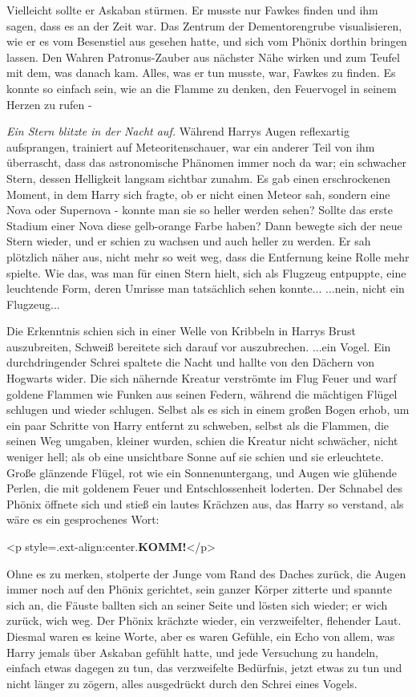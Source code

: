 Vielleicht sollte er Askaban stürmen. Er musste nur Fawkes finden und ihm sagen,
dass es an der Zeit war. Das Zentrum der Dementorengrube visualisieren, wie er
es vom Besenstiel aus gesehen hatte, und sich vom Phönix dorthin bringen lassen.
Den Wahren Patronus-Zauber aus nächster Nähe wirken und zum Teufel mit dem, was
danach kam. Alles, was er tun musste, war, Fawkes zu finden. Es konnte so
einfach sein, wie an die Flamme zu denken, den Feuervogel in seinem Herzen zu
rufen -

\emph{Ein Stern blitzte in der Nacht auf.}
Während Harrys Augen reflexartig aufsprangen, trainiert auf Meteoritenschauer,
war ein anderer Teil von ihm überrascht, dass das astronomische Phänomen immer
noch da war; ein schwacher Stern, dessen Helligkeit langsam sichtbar zunahm. Es
gab einen erschrockenen Moment, in dem Harry sich fragte, ob er nicht einen
Meteor sah, sondern eine Nova oder Supernova - konnte man sie so heller werden
sehen? Sollte das erste Stadium einer Nova diese gelb-orange Farbe haben? Dann
bewegte sich der neue Stern wieder, und er schien zu wachsen und auch heller zu
werden. Er sah plötzlich näher aus, nicht mehr so weit weg, dass die Entfernung
keine Rolle mehr spielte. Wie das, was man für einen Stern hielt, sich als
Flugzeug entpuppte, eine leuchtende Form, deren Umrisse man tatsächlich sehen
konnte... ...nein, nicht ein Flugzeug...

Die Erkenntnis schien sich in einer Welle von Kribbeln in Harrys Brust
auszubreiten, Schweiß bereitete sich darauf vor auszubrechen. ...ein Vogel. Ein
durchdringender Schrei spaltete die Nacht und hallte von den Dächern von
Hogwarts wider. Die sich nähernde Kreatur verströmte im Flug Feuer und warf
goldene Flammen wie Funken aus seinen Federn, während die mächtigen Flügel
schlugen und wieder schlugen. Selbst als es sich in einem großen Bogen erhob, um
ein paar Schritte von Harry entfernt zu schweben, selbst als die Flammen, die
seinen Weg umgaben, kleiner wurden, schien die Kreatur nicht schwächer, nicht
weniger hell; als ob eine unsichtbare Sonne auf sie schien und sie erleuchtete.
Große glänzende Flügel, rot wie ein Sonnenuntergang, und Augen wie glühende
Perlen, die mit goldenem Feuer und Entschlossenheit loderten. Der Schnabel des
Phönix öffnete sich und stieß ein lautes Krächzen aus, das Harry so verstand,
als wäre es ein gesprochenes Wort:

<p style=\grqq{}.ext-align:center\grqq{}.\textbf{KOMM!}</p>

Ohne es zu merken, stolperte der Junge vom Rand des Daches zurück, die Augen
immer noch auf den Phönix gerichtet, sein ganzer Körper zitterte und spannte
sich an, die Fäuste ballten sich an seiner Seite und lösten sich wieder; er wich
zurück, wich weg. Der Phönix krächzte wieder, ein verzweifelter, flehender Laut.
Diesmal waren es keine Worte, aber es waren Gefühle, ein Echo von allem, was
Harry jemals über Askaban gefühlt hatte, und jede Versuchung zu handeln, einfach
etwas dagegen zu tun, das verzweifelte Bedürfnis, jetzt etwas zu tun und nicht
länger zu zögern, alles ausgedrückt durch den Schrei eines Vogels.


